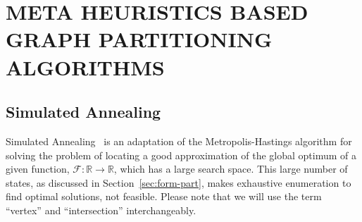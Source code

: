 \section{META HEURISTICS BASED GRAPH PARTITIONING ALGORITHMS}
\label{sec:meta}

\subsection{Simulated Annealing}
\label{sec:simu-anne}

\begin{scriptsize}
\begin{algorithm}[ht!]
\end{algorithm}
\end{scriptsize}

Simulated Annealing~\cite{kirkpatrick1983optimization} is an adaptation of the Metropolis-Hastings algorithm for solving the problem of locating a good approximation of the global optimum of a given
function, $\mathcal{F}: \mathbb{R} \rightarrow \mathbb{R}$, which has a
large search space. This large number of states, as discussed in Section~\ref{sec:form-part}, makes exhaustive enumeration to find optimal solutions, not feasible. Please note that we will use the term ``vertex'' and ``intersection'' interchangeably.

